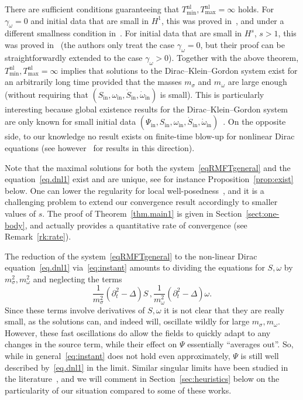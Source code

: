 \documentclass[AHL,Unicode,longabstracts,published]{cedram}
\newcommand{\rmin}{\mathrm{in}}
\newcommand{\nl}{\mathrm{nl}}
\begin{document}
There are sufficient conditions guaranteeing that $T_{\min}^{\nl}, T_{\max}^{\nl}=\infty$ holds. For $\gamma_\omega=0$ and initial data that are small in $H^1$, this was proved in~\cite{bejenaru2015}, and under a different smallness condition in~\cite{candy2018}. For initial data that are small in $H^s$, $s>1$, this was proved in~\cite{machihara2003} (the authors only treat the case $\gamma_\omega=0$, but their proof can be straightforwardly extended to the case $\gamma_\omega>0$). Together with the above theorem, $T_{\min}^{\nl}, T_{\max}^{\nl}=\infty$ implies that solutions to the Dirac--Klein--Gordon system exist for an arbitrarily long time provided that the masses $m_\sigma$ and $m_\omega$ are large enough (without requiring that $(S_\rmin,\omega_\rmin,\dot{S}_\rmin,\dot{\omega}_\rmin)$ is small). This is particularly interesting because global existence results for the Dirac--Klein--Gordon system are only known for small initial data $(\Psi_\rmin,S_\rmin,\omega_\rmin,\dot{S}_\rmin,\dot{\omega}_\rmin)$~\cite{bejenaru2017}. On the opposite side, to our knowledge no result exists on finite-time blow-up for nonlinear Dirac equations (see however~\cite{DanOka-16,HuhPel-19} for results in this direction).

Note that the maximal solutions for both the system~\eqref{eqRMFTgeneral} and the equation~\eqref{eq.dnl1} exist and are unique, see for instance Proposition~\ref{prop:exist} below. One can lower the regularity for local well-posedness~\cite{bejenaru2015,bejenaru2017,machihara2003}, and it is a challenging problem to extend our convergence result accordingly to smaller values of $s$. The proof of Theorem~\ref{thm.main1} is given in Section~\ref{sect:one-body}, and actually provides a quantitative rate of convergence (see Remark~\ref{rk:rate}).

The reduction of the system~\eqref{eqRMFTgeneral} to the non-linear Dirac equation~\eqref{eq.dnl1} via~\eqref{eq:instant} amounts to dividing the equations for $S, \omega$ by $m_\sigma^2, m_\omega^2$ and neglecting the terms
\begin{equation}
\frac{1}{m_\sigma^2}\left(\partial^2_t-\Delta\right)S\,,\frac{1}{m_\omega^2}\left(\partial^2_t-\Delta\right)\omega.
\end{equation}
Since these terms involve derivatives of $S, \omega$ it is not clear that they are really small, as the solutions can, and indeed will, oscillate wildly for large $m_\sigma, m_\omega$. However, these fast oscillations do allow the fields to quickly adapt to any changes in the source term, while their effect on $\Psi$ essentially ``averages out''. So, while in general~\eqref{eq:instant} does not hold even approximately, $\Psi$ is still well described by~\eqref{eq.dnl1} in the limit. Similar singular limits have been studied in the literature~\cite{added1988,baumstark2020,
daub2016,griesemer2017,schochet1986}, and we will comment in Section~\ref{sec:heuristics} below on the particularity of our situation compared to some of these works.
\end{document}
